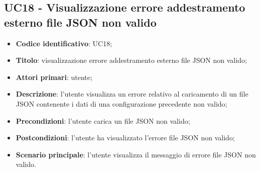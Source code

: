 \subsection{UC18 - Visualizzazione errore addestramento esterno file JSON non valido}
\begin{itemize}
	\item \textbf{Codice identificativo}: UC18;
	\item \textbf{Titolo}: visualizzazione errore addestramento esterno file JSON non valido;
	\item \textbf{Attori primari}: utente;
	\item \textbf{Descrizione}: l'utente visualizza un errore relativo al caricamento di un file JSON contenente i dati di una configurazione precedente non valido;
	\item \textbf{Precondizioni}: l'utente carica un file JSON non valido;
	\item \textbf{Postcondizioni}: l'utente ha visualizzato l'errore file JSON non valido;	
	\item \textbf{Scenario principale}: l'utente visualizza il messaggio di errore file JSON non valido.	
\end{itemize}
